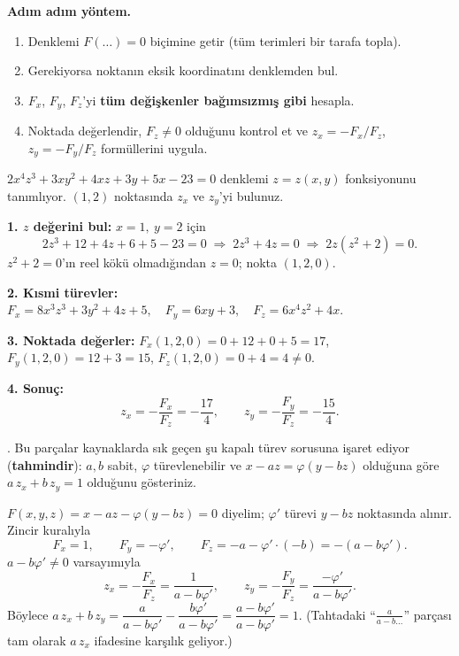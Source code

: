 \textbf{Adım adım yöntem.}
\begin{enumerate}
  \item Denklemi $F(\dots)=0$ biçimine getir (tüm terimleri bir tarafa topla).
  \item Gerekiyorsa noktanın eksik koordinatını denklemden bul.
  \item $F_x$, $F_y$, $F_z$'yi \textbf{tüm değişkenler bağımsızmış gibi} hesapla.
  \item Noktada değerlendir, $F_z\ne0$ olduğunu kontrol et ve $z_x=-F_x/F_z$, $z_y=-F_y/F_z$ formüllerini uygula.
\end{enumerate}

\begin{soru}
$2x^4z^3+3xy^2+4xz+3y+5x-23=0$ denklemi $z=z(x,y)$ fonksiyonunu tanımlıyor. $(1,2)$ noktasında $z_x$ ve $z_y$'yi bulunuz.
\end{soru}
\begin{cevap}
\textbf{1. $z$ değerini bul:} $x=1,\ y=2$ için
\[
2z^3+12+4z+6+5-23=0\;\Rightarrow\;2z^3+4z=0\;\Rightarrow\;2z(z^2+2)=0 .
\]
$z^2+2=0$'ın reel kökü olmadığından $z=0$; nokta $(1,2,0)$.

\textbf{2. Kısmi türevler:}
$F_x=8x^3z^3+3y^2+4z+5,\quad F_y=6xy+3,\quad F_z=6x^4z^2+4x$.

\textbf{3. Noktada değerler:} $F_x(1,2,0)=0+12+0+5=17$, $F_y(1,2,0)=12+3=15$, $F_z(1,2,0)=0+4=4\ne0$.

\textbf{4. Sonuç:}
\[
z_x=-\frac{F_x}{F_z}=\boxed{-\frac{17}{4}},\qquad z_y=-\frac{F_y}{F_z}=\boxed{-\frac{15}{4}}.
\]
\end{cevap}

\begin{soru}
. Bu parçalar kaynaklarda sık geçen şu kapalı türev sorusuna işaret ediyor (\textbf{tahmindir}):
$a,b$ sabit, $\varphi$ türevlenebilir ve $x-az=\varphi(y-bz)$ olduğuna göre $a\,z_x+b\,z_y=1$ olduğunu gösteriniz.
\end{soru}
\begin{cevap}
$F(x,y,z)=x-az-\varphi(y-bz)=0$ diyelim; $\varphi'$ türevi $y-bz$ noktasında alınır. Zincir kuralıyla
\[
F_x=1,\qquad F_y=-\varphi',\qquad F_z=-a-\varphi'\cdot(-b)=-(a-b\varphi').
\]
$a-b\varphi'\ne0$ varsayımıyla
\[
z_x=-\frac{F_x}{F_z}=\frac{1}{a-b\varphi'},\qquad z_y=-\frac{F_y}{F_z}=\frac{-\varphi'}{a-b\varphi'} .
\]
Böylece $a\,z_x+b\,z_y=\dfrac{a}{a-b\varphi'}-\dfrac{b\varphi'}{a-b\varphi'}=\dfrac{a-b\varphi'}{a-b\varphi'}=1$.
(Tahtadaki ``$\frac{a}{a-b\dots}$'' parçası tam olarak $a\,z_x$ ifadesine karşılık geliyor.)
\end{cevap}

